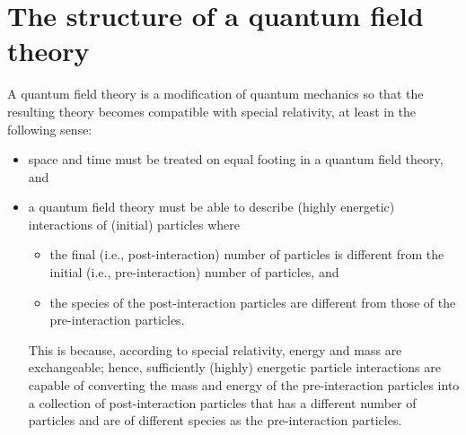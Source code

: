 

\chapter{The structure of a quantum field theory}
\setcounter{theorem}{0}
\setcounter{equation}{0}


\renewcommand{\theenumi}{\roman{enumi}}
\renewcommand{\labelenumi}{\textnormal{(\theenumi)}$\;\;$}


A quantum field theory is a modification of quantum mechanics
so that the resulting theory becomes compatible with special relativity,
at least in the following sense:
\begin{itemize}
\item
	space and time must be treated on equal footing in a quantum field theory, and
\item
	a quantum field theory must be able to describe (highly energetic)
	interactions of (initial) particles where
	\begin{itemize}
	\item
		the final (i.e., post-interaction) number of particles is different
		from the initial (i.e., pre-interaction) number of particles, and
	\item
		the species of the post-interaction particles are different
		from those of the pre-interaction particles.
	\end{itemize}
	This is because, according to special relativity, energy and mass are exchangeable;
	hence, sufficiently (highly) energetic particle interactions are capable of converting
	the mass and energy of the pre-interaction particles into a collection of post-interaction
	particles that has a different number of particles and are of different species as the pre-interaction particles.
\end{itemize}



